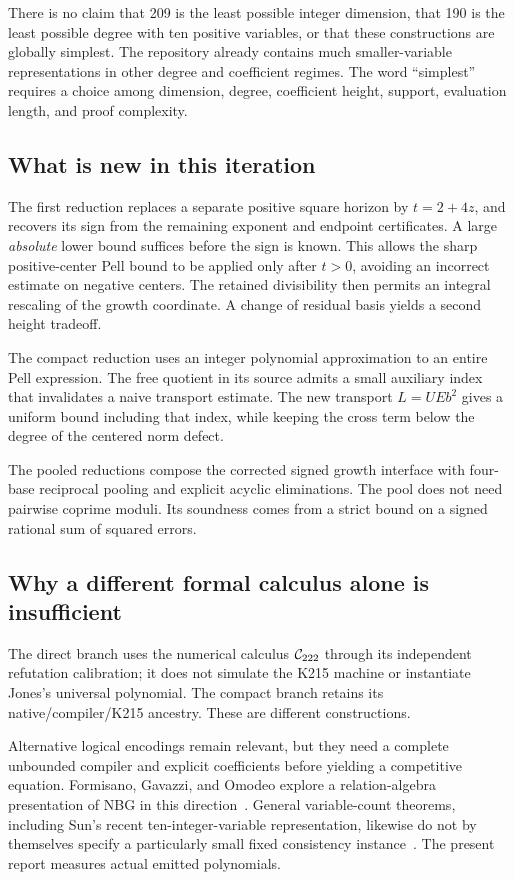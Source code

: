 There is no claim that 209 is the least possible integer dimension, that
190 is the least possible degree with ten positive variables, or that
these constructions are globally simplest. The repository already contains
much smaller-variable representations in other degree and coefficient
regimes. The word ``simplest'' requires a choice among dimension, degree,
coefficient height, support, evaluation length, and proof complexity.

\subsection{What is new in this iteration}

The first reduction replaces a separate positive square horizon by
\(t=2+4z\), and recovers its sign from the remaining exponent and endpoint
certificates. A large \emph{absolute} lower bound suffices before the sign
is known. This allows the sharp positive-center Pell bound to be applied
only after \(t>0\), avoiding an incorrect estimate on negative centers.
The retained divisibility then permits an integral rescaling of the growth
coordinate. A change of residual basis yields a second height tradeoff.

The compact reduction uses an integer polynomial approximation to an
entire Pell expression. The free quotient in its source admits a small
auxiliary index that invalidates a naive transport estimate. The new
transport \(L=UEb^2\) gives a uniform bound including that index, while
keeping the cross term below the degree of the centered norm defect.

The pooled reductions compose the corrected signed growth interface with
four-base reciprocal pooling and explicit acyclic eliminations. The pool
does not need pairwise coprime moduli. Its soundness comes from a strict
bound on a signed rational sum of squared errors.

\subsection{Why a different formal calculus alone is insufficient}

The direct branch uses the numerical calculus \(\mathcal C_{222}\) through its
independent refutation calibration; it does not simulate the K215 machine
or instantiate Jones's universal polynomial. The compact branch retains
its native/compiler/K215 ancestry. These are different constructions.

Alternative logical encodings remain relevant, but they need a complete
unbounded compiler and explicit coefficients before yielding a competitive
equation. Formisano, Gavazzi, and Omodeo explore a relation-algebra
presentation of NBG in this direction~\cite{fgo}. General variable-count
theorems, including Sun's recent ten-integer-variable representation,
likewise do not by themselves specify a particularly small fixed
consistency instance~\cite{sun10}. The present report measures actual
emitted polynomials.
